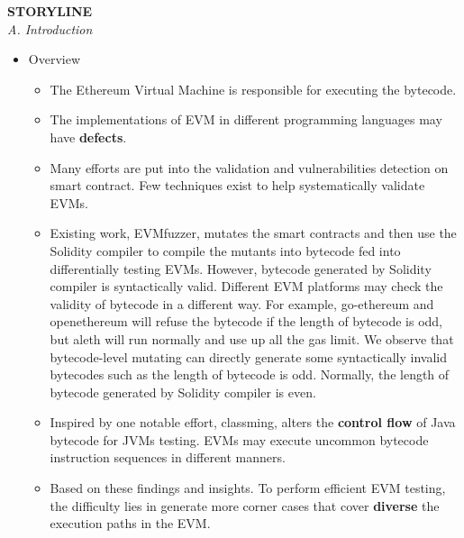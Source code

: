 \documentclass[a4paper]{article}
\begin{document}
		\textbf{STORYLINE}\\
	\textit{A. Introduction}
	\begin{itemize}
		\item Overview
		\begin{itemize}
			\item The Ethereum Virtual Machine is responsible for executing the bytecode.
			\item The implementations of EVM in different programming languages may have \textbf{defects}.
			\item Many efforts are put into the validation and vulnerabilities detection on smart contract. Few techniques exist to help systematically validate EVMs. 
			\item Existing work, EVMfuzzer, mutates the smart contracts and then use the Solidity compiler to compile the mutants into bytecode fed into differentially testing EVMs. However, bytecode generated by Solidity compiler is syntactically valid. Different EVM platforms may check the validity of bytecode in a different way. For example, go-ethereum and openethereum will refuse the bytecode if the length of bytecode is odd, but aleth will run normally and use up all the gas limit. We observe that bytecode-level mutating can directly generate some syntactically invalid bytecodes such as the length of bytecode is odd. Normally, the length of bytecode generated by Solidity compiler is even.
			
			\item Inspired by one notable effort, classming, alters the \textbf{control flow} of Java bytecode for JVMs testing. EVMs may execute uncommon
			bytecode instruction sequences in different manners.
			
			\item Based on these findings and insights. To perform
			efficient EVM testing, the difficulty lies in generate more corner cases that cover \textbf{diverse} the execution paths in the EVM.
			


\end{itemize}
\end{itemize}
\end{document}
